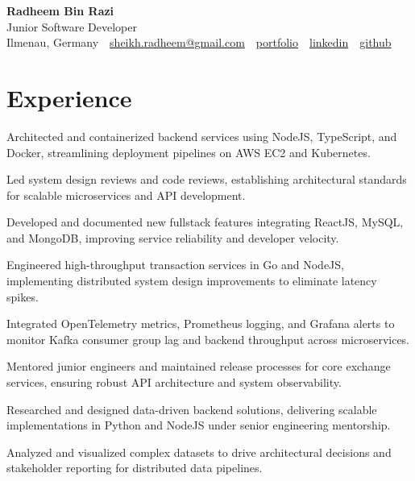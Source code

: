 \documentclass[10pt,a4paper]{resume}
\makeatletter
\newcommand{\Portfolio}{https://radheem.github.io/my-cv}
\newcommand{\PortfolioText}{portfolio}
\newcommand{\GitHub}{https://github.com/radheem}
\newcommand{\LinkedIn}{https://www.linkedin.com/in/radheem-razi}
\newcommand{\Email}{sheikh.radheem@gmail.com}
\makeatother
\begin{document}
\begin{center}
  {\huge\bfseries Radheem Bin Razi}\\[3pt]
  {\large Junior Software Developer}\\[6pt]
  \small
  Ilmenau, Germany \,\textbar\,
  \href{mailto:\Email}{\Email} \,\textbar\,
  \href{\Portfolio}{\PortfolioText} \,\textbar\,
  \href{\LinkedIn}{linkedin} \,\textbar\,
  \href{\GitHub}{github}
\end{center}
\vspace{2pt}

\section{Experience}

\bullets
  \item Architected and containerized backend services using NodeJS, TypeScript, and Docker, streamlining deployment pipelines on AWS EC2 and Kubernetes.
  \item Led system design reviews and code reviews, establishing architectural standards for scalable microservices and API development.
  \item Developed and documented new fullstack features integrating ReactJS, MySQL, and MongoDB, improving service reliability and developer velocity.
\bulletsend
\vspace{1.5pt}
\bullets
  \item Engineered high-throughput transaction services in Go and NodeJS, implementing distributed system design improvements to eliminate latency spikes.
  \item Integrated OpenTelemetry metrics, Prometheus logging, and Grafana alerts to monitor Kafka consumer group lag and backend throughput across microservices.
  \item Mentored junior engineers and maintained release processes for core exchange services, ensuring robust API architecture and system observability.
\bulletsend
\vspace{1.5pt}
\bullets
  \item Researched and designed data-driven backend solutions, delivering scalable implementations in Python and NodeJS under senior engineering mentorship.
  \item Analyzed and visualized complex datasets to drive architectural decisions and stakeholder reporting for distributed data pipelines.
\bulletsend
\vspace{1.5pt}
\end{document}
